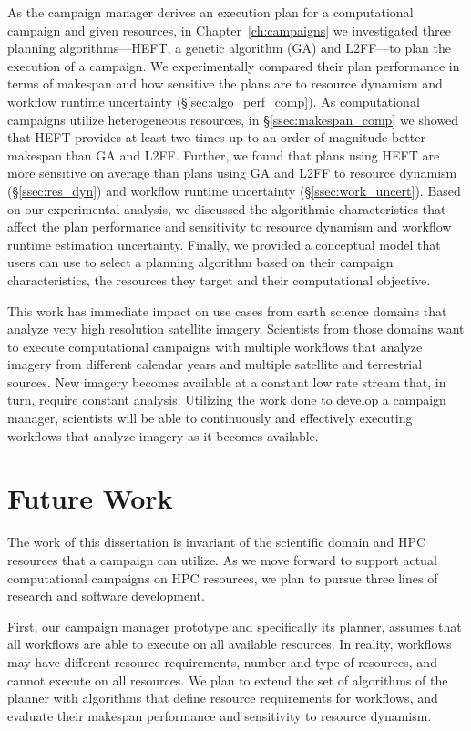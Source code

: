 As the campaign manager derives an execution plan for a computational campaign
and given resources, in Chapter~\ref{ch:campaigns} we investigated three
planning algorithms---HEFT, a genetic algorithm (GA) and L2FF---to plan the
execution of a campaign. We experimentally compared their plan performance in
terms of makespan and how sensitive the plans are to resource dynamism and
workflow runtime uncertainty (\S\ref{sec:algo_perf_comp}). As computational
campaigns utilize heterogeneous resources, in \S\ref{ssec:makespan_comp} we
showed that HEFT provides at least two times up to an order of magnitude better
makespan than GA and L2FF. Further, we found that plans using HEFT are more
sensitive on average than plans using GA and L2FF to resource dynamism
(\S\ref{ssec:res_dyn}) and workflow runtime uncertainty
(\S\ref{ssec:work_uncert}). Based on our experimental analysis, we discussed the
algorithmic characteristics that affect the plan performance and sensitivity to
resource dynamism and workflow runtime estimation uncertainty. Finally, we
provided a conceptual model that users can use to select a planning algorithm
based on their campaign characteristics, the resources they target and their
computational objective.

This work has immediate impact on use cases from earth science domains that
analyze very high resolution satellite imagery. Scientists from those domains
want to execute computational campaigns with multiple workflows that analyze
imagery from different calendar years and multiple satellite and terrestrial
sources. New imagery becomes available at a constant low rate stream that, in
turn, require constant analysis. Utilizing the work done to develop a campaign
manager, scientists will be able to continuously and effectively executing
workflows that analyze imagery as it becomes available.

\section{Future Work}

The work of this dissertation is invariant of the scientific domain and HPC
resources that a campaign can utilize. As we move forward to support actual
computational campaigns on HPC resources, we plan to pursue three lines of
research and software development.

First, our campaign manager prototype and specifically its planner, assumes that
all workflows are able to execute on all available resources. In reality,
workflows may have different resource requirements, number and type of
resources, and cannot execute on all resources. We plan to extend the set of
algorithms of the planner with algorithms that define resource requirements for
workflows, and evaluate their makespan performance and sensitivity to resource
dynamism.

